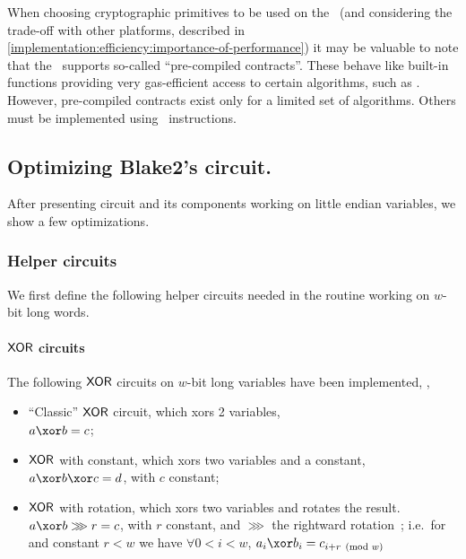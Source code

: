 When choosing cryptographic primitives to be used on the \evm~(and considering the trade-off with other platforms, described in \cref{implementation:efficiency:importance-of-performance}) it may be valuable to note that the \evm~supports so-called ``pre-compiled contracts''. These behave like built-in functions providing very gas-efficient access to certain algorithms, such as \keccak. However, pre-compiled contracts exist only for a limited set of algorithms. Others must be implemented using \evm~instructions.

\subsection{Optimizing Blake2's circuit.}\label{implementation:efficiency:blake}

After presenting  circuit and its components working on little endian variables, we show a few optimizations.

\subsubsection{Helper circuits}\label{implementation:efficiency:blake:helper-circuits}
We first define the following helper circuits needed in the  routine working on $w$-bit long words.

\paragraph{$\mathsf{XOR}$ circuits}

The following $\mathsf{XOR}$ circuits on $w$-bit long variables have been implemented, ,
\begin{itemize}
  \item ``Classic'' $\mathsf{XOR}$ circuit, which xors 2 variables,\\ $a \xor b = c$;
  \item $\mathsf{XOR}$ with constant, which xors two variables and a constant,\\ $a \xor b \xor c = d$, with $c$ constant;
  \item $\mathsf{XOR}$ with rotation, which xors two variables and rotates the result.\\
  $a \xor b \ggg r = c$, with $r$ constant, and $\ggg$ the rightward rotation~\cite[Section 2.3]{blakecompietf};
  i.e.~for and constant $r < w$ we have $\forall 0 < i < w$, $a_i \xor b_i = c_{i+r \pmod w}$
\end{itemize}

